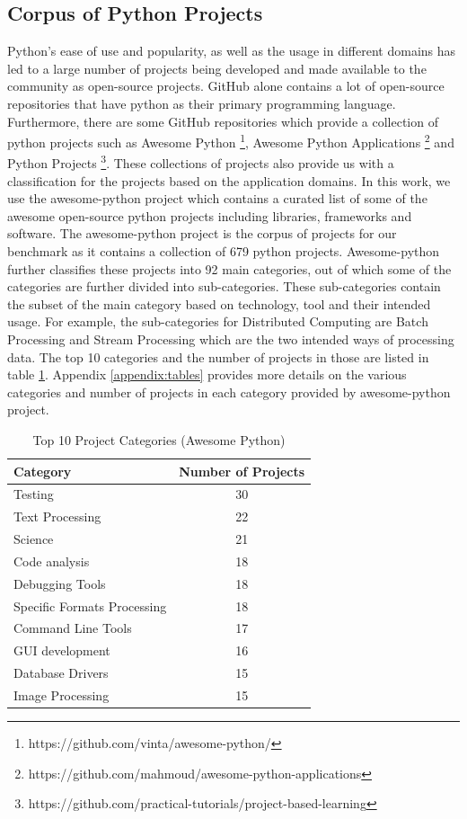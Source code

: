\subsection{Corpus of Python Projects}
\label{approach:corpus of python projects}
Python's ease of use and popularity, as well as the usage in different domains has led to a large number of projects being developed and made available to the community as open-source projects.
GitHub alone contains a lot of open-source repositories that have python as their primary programming language.
Furthermore, there are some GitHub repositories which provide a collection of python projects such as Awesome Python \footnote{https://github.com/vinta/awesome-python/}, Awesome Python Applications \footnote{https://github.com/mahmoud/awesome-python-applications} and Python Projects \footnote{https://github.com/practical-tutorials/project-based-learning}.
These collections of projects also provide us with a classification for the projects based on the application domains.
In this work, we use the awesome-python project which contains a curated list of some of the awesome open-source python projects including libraries, frameworks and software. 
The awesome-python project is the corpus of projects for our benchmark as it contains a collection of 679 python projects.
Awesome-python further classifies these projects into 92 main categories, out of which some of the categories are further divided into sub-categories.
These sub-categories contain the subset of the main category based on technology, tool and their intended usage.
For example, the sub-categories for Distributed Computing are Batch Processing and Stream Processing which are the two intended ways of processing data.
The top 10 categories and the number of projects in those are listed in table \ref{table:awesome-python}.
Appendix \ref{appendix:tables} provides more details on the various categories and number of projects in each category provided by awesome-python project.

\begin{table}[ht]
    \centering
    \begin{tabular}{lc}
    \hline
    \textbf{Category} & \textbf{Number of Projects}\\
    \hline
    Testing & 30\\
    Text Processing & 22\\
    Science & 21\\
    Code analysis & 18\\
    Debugging Tools & 18\\
    Specific Formats Processing & 18\\
    Command Line Tools & 17\\
    GUI development & 16\\
    Database Drivers & 15\\
    Image Processing & 15\\
    \hline
    \end{tabular}
    \caption{Top 10 Project Categories (Awesome Python)}
    \label{table:awesome-python}
\end{table}


